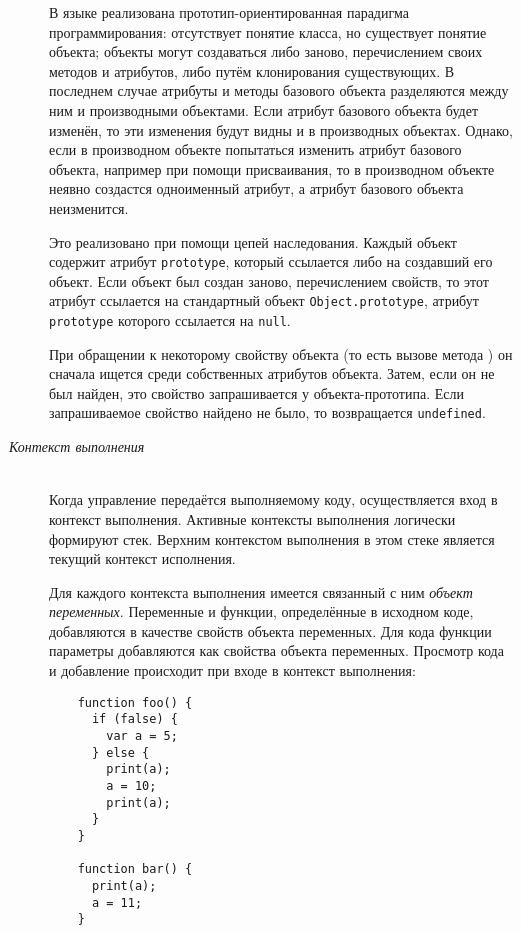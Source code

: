 \begin{description}
    В языке реализована прототип-ориентированная парадигма
    программирования: отсутствует понятие класса, но существует
    понятие объекта; объекты могут создаваться либо заново,
    перечислением своих методов и атрибутов, либо путём
    клонирования существующих. В последнем случае атрибуты и методы
    базового объекта разделяются между ним и производными объектами.
    Если атрибут базового объекта будет изменён, то эти изменения
    будут видны и в производных объектах. Однако, если в производном
    объекте попытаться изменить атрибут базового объекта, например при
    помощи присваивания, то в производном объекте неявно создастся
    одноименный атрибут, а атрибут базового объекта неизменится.

    Это реализовано при помощи цепей наследования. Каждый объект
    содержит атрибут \texttt{prototype}, который ссылается либо на
    создавший его объект. Если объект был создан заново, перечислением
    свойств, то этот атрибут ссылается на стандартный объект
    \texttt{Object.prototype}, атрибут \texttt{prototype} которого
    ссылается на \texttt{null}.

    При обращении к некоторому свойству объекта (то есть вызове метода
    ) он сначала ищется среди собственных атрибутов
    объекта. Затем, если он не был найден, это свойство запрашивается
    у объекта-прототипа. Если запрашиваемое свойство найдено не было, то
    возвращается \texttt{undefined}.
    \item[\emph{Контекст выполнения}]~\\  %
      Когда управление передаётся выполняемому коду, осуществляется
      вход в контекст выполнения. Активные контексты выполнения
      логически формируют стек. Верхним контекстом выполнения в этом
      стеке является текущий контекст исполнения.

      Для каждого контекста выполнения имеется связанный с ним
      \emph{объект переменных}. Переменные и функции, определённые в
      исходном коде, добавляются в качестве свойств объекта
      переменных. Для кода функции параметры добавляются как свойства
      объекта переменных. Просмотр кода и добавление происходит при
      входе в контекст выполнения:
      \begin{lstlisting}
	function foo() {
	  if (false) {
	    var a = 5;
	  } else {
	    print(a);
	    a = 10;
	    print(a);
	  }
	}

	function bar() {
	  print(a);
	  a = 11;
	}


\end{lstlisting}
\end{description}
